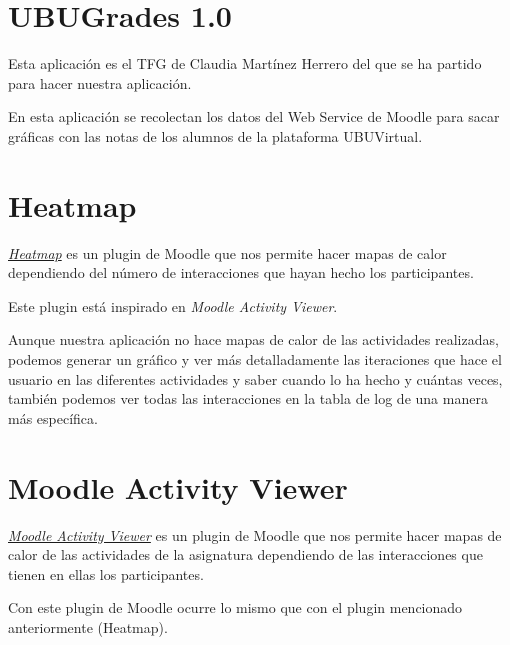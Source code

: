 
\section{UBUGrades 1.0}\label{ubugrades--10}

Esta aplicación es el TFG de Claudia Martínez Herrero \cite{claudia} del que se ha partido para hacer nuestra aplicación.

En esta aplicación se recolectan los datos del Web Service de Moodle para sacar gráficas con las notas de los alumnos de la plataforma UBUVirtual.

\newpage\section{Heatmap}\label{heatmap}

\href{https://moodle.org/plugins/block_heatmap}{\emph{Heatmap}} es un plugin de Moodle que nos permite hacer mapas de calor dependiendo del número de interacciones que hayan hecho los participantes.

Este plugin está inspirado en \emph{Moodle Activity Viewer}.


Aunque nuestra aplicación no hace mapas de calor de las actividades realizadas, podemos generar un gráfico y ver más detalladamente las iteraciones que hace el usuario en las diferentes actividades y saber cuando lo ha hecho y cuántas veces, también podemos ver todas las interacciones en la tabla de log de una manera más específica.


\newpage\section{ Moodle Activity Viewer}\label{moodle-activity-viewer}

\href{https://damos.world/2013/08/30/the-moodle-activity-viewer-mav-heatmaps-of-student-activity/}{ \emph{Moodle Activity Viewer}} es un plugin de Moodle que nos permite hacer mapas de calor de las actividades de la asignatura dependiendo de las interacciones que tienen en ellas los participantes.


Con este plugin de Moodle ocurre lo mismo que con el plugin mencionado anteriormente (Heatmap).

